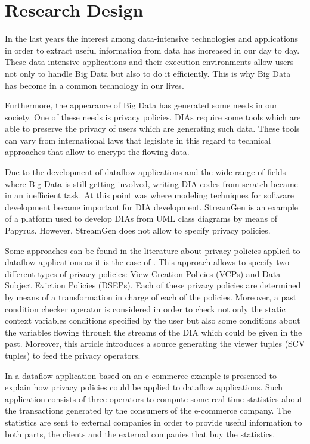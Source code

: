\chapter[Research Design]{Research Design}
\label{sec:chapter3}

In the last years the interest among data-intensive technologies and applications in order to extract useful information from data has increased in our day to day. These data-intensive applications and their execution environments allow users not only to handle Big Data but also to do it efficiently. This is why Big Data has become in a common technology in our lives.

Furthermore, the appearance of Big Data has generated some needs in our society. One of these needs is privacy policies. DIAs require some tools which are able to preserve the privacy of users which are generating such data. These tools can vary from international laws that legislate in this regard to technical approaches that allow to encrypt the flowing data.

Due to the development of dataflow applications and the wide range of fields where Big Data is still getting involved, writing DIA codes from scratch became in an inefficient task. At this point was where modeling techniques for software development became important for DIA development. StreamGen is an example of a platform used to develop DIAs from UML class diagrams by means of Papyrus. However, StreamGen does not allow to specify privacy policies.

Some approaches can be found in the literature about privacy policies applied to dataflow applications as it is the case of \cite{privacypoliciesarticle}. This approach allows to specify two different types of privacy policies: View Creation Policies (VCPs) and Data Subject Eviction Policies (DSEPs). Each of these privacy policies are determined by means of a transformation in charge of each of the policies. Moreover, a past condition checker operator is considered in order to check not only the static context variables conditions specified by the user but also some conditions about the variables flowing through the streams of the DIA which could be given in the past. Moreover, this article introduces a source generating the viewer tuples (SCV tuples) to feed the privacy operators.

In \cite{privacypoliciesarticle} a dataflow application based on an e-commerce example is presented to explain how privacy policies could be applied to dataflow applications. Such application consists of three operators to compute some real time statistics about the transactions generated by the consumers of the e-commerce company. The statistics are sent to external companies in order to provide useful information to both parts, the clients and the external companies that buy the statistics.

